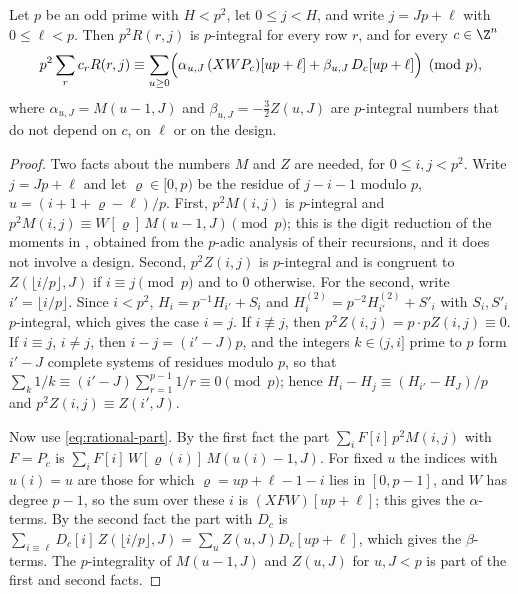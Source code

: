 \begin{lemma}\label{lem:digits}
Let $p$ be an odd prime with $H<p^2$, let $0\le j<H$, and write $j=Jp+\ell$ with $0\le\ell<p$. Then
$p^2R(r,j)$ is $p$-integral for every row $r$, and for every $c\in\Z^n$
\[
 p^2\sum_rc_rR(r,j)\equiv\sum_{u\ge0}\Bigl(\alpha_{u,J}\,(XWP_c)[up+\ell]+\beta_{u,J}\,D_c[up+\ell]\Bigr)
 \pmod p ,
\]
where $\alpha_{u,J}=M(u-1,J)$ and $\beta_{u,J}=-\tfrac32Z(u,J)$ are $p$-integral numbers that do not depend on
$c$, on $\ell$ or on the design.
\end{lemma}

\begin{proof}
Two facts about the numbers $M$ and $Z$ are needed, for $0\le i,j<p^2$. Write $j=Jp+\ell$ and let
$\varrho\in[0,p)$ be the residue of $j-i-1$ modulo $p$, $u=(i+1+\varrho-\ell)/p$. First, $p^2M(i,j)$ is
$p$-integral and $p^2M(i,j)\equiv W[\varrho]\,M(u-1,J)\pmod p$; this is the digit reduction of the moments in
\cite[\S3]{OpenAI2026}, obtained from the $p$-adic analysis of their recursions, and it does not involve a design.
Second, $p^2Z(i,j)$ is $p$-integral and is congruent to $Z(\lfloor i/p\rfloor,J)$ if $i\equiv j\pmod p$ and to
$0$ otherwise. For the second, write $i'=\lfloor i/p\rfloor$. Since $i<p^2$, $H_i=p^{-1}H_{i'}+S_i$ and
$H^{(2)}_i=p^{-2}H^{(2)}_{i'}+S'_i$ with $S_i,S'_i$ $p$-integral, which gives the case $i=j$. If $i\not\equiv j$,
then $p^2Z(i,j)=p\cdot pZ(i,j)\equiv0$. If $i\equiv j$, $i\ne j$, then $i-j=(i'-J)p$, and the integers
$k\in(j,i]$ prime to $p$ form $i'-J$ complete systems of residues modulo $p$, so that
$\sum_k1/k\equiv(i'-J)\sum_{r=1}^{p-1}1/r\equiv0\pmod p$; hence $H_i-H_j\equiv(H_{i'}-H_J)/p$ and
$p^2Z(i,j)\equiv Z(i',J)$.

Now use \eqref{eq:rational-part}. By the first fact the part $\sum_iF[i]\,p^2M(i,j)$ with $F=P_c$ is
$\sum_iF[i]\,W[\varrho(i)]\,M(u(i)-1,J)$. For fixed $u$ the indices with $u(i)=u$ are those for which
$\varrho=up+\ell-1-i$ lies in $[0,p-1]$, and $W$ has degree $p-1$, so the sum over these $i$ is
$(XFW)[up+\ell]$; this gives the $\alpha$-terms. By the second fact the part with $D_c$ is
$\sum_{i\equiv\ell}D_c[i]\,Z(\lfloor i/p\rfloor,J)=\sum_uZ(u,J)D_c[up+\ell]$, which gives the $\beta$-terms.
The $p$-integrality of $M(u-1,J)$ and $Z(u,J)$ for $u,J<p$ is part of the first and second facts.
\end{proof}

